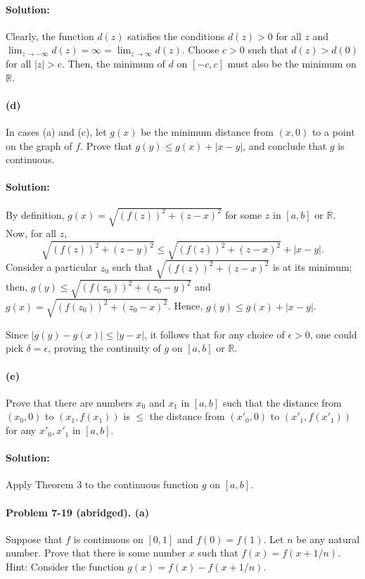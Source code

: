 \documentclass{article}
\begin{document}
\paragraph{Solution:} Clearly, the function $d(z)$ satisfies the conditions
$d(z) > 0$ for all $z$ and $\lim_{z \rightarrow -\infty}d(z) = \infty = \lim_{z
\rightarrow \infty}d(z)$. Choose $c > 0$ such that $d(z) > d(0)$ for all $|z| >
c$. Then, the minimum of $d$ on $[-c, c]$ must also be the minimum on
$\mathbb{R}$.

\paragraph{(d)} In cases (a) and (c), let $g(x)$ be the minimum distance from
$(x, 0)$ to a point on the graph of $f$. Prove that $g(y) \leq g(x) + |x - y|$,
and conclude that $g$ is continuous.

\paragraph{Solution:} By definition, $g(x) = \sqrt{(f(z))^2 + (z - x)^2}$ for
some $z$ in $[a, b]$ or $\mathbb{R}$. Now, for all $z$, \begin{equation*}
  \sqrt{(f(z))^2 + (z - y)^2} \leq \sqrt{(f(z))^2 + (z - x)^2} + |x - y|.
\end{equation*}
Consider a particular $z_0$ such that $\sqrt{(f(z))^2 + (z - x)^2}$ is at its
minimum; then, $g(y) \leq \sqrt{(f(z_0))^2 + (z_0 - y)^2}$ and $g(x) = \sqrt{
(f(z_0))^2 + (z_0 - x)^2}$. Hence, $g(y) \leq g(x) + |x - y|$.

Since $|g(y) - g(x)| \leq |y - x|$, it follows that for any choice of $\epsilon
> 0$, one could pick $\delta = \epsilon$, proving the continuity of $g$ on $[a,
b]$ or $\mathbb{R}$.

\paragraph{(e)} Prove that there are numbers $x_0$ and $x_1$ in $[a, b]$ such
that the distance from $(x_0, 0)$ to $(x_1, f(x_1))$ is $\leq$ the distance
from $(x'_0, 0)$ to $(x'_1, f(x'_1))$ for any $x'_0, x'_1$ in $[a, b]$.

\paragraph{Solution:} Apply Theorem 3 to the continuous function $g$ on $[a,
b]$.

\paragraph{Problem 7-19 (abridged). (a)} Suppose that $f$ is continuous on $[0,
1]$ and $f(0) = f(1)$. Let $n$ be any natural number. Prove that there is some
number $x$ such that $f(x) = f(x + 1/n)$. Hint: Consider the function $g(x) =
f(x) - f(x + 1/n)$.
\end{document}
